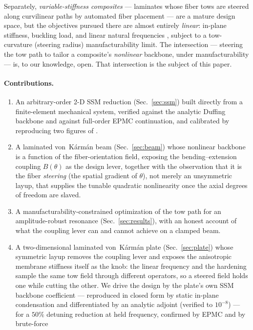\documentclass[11pt]{article}
\begin{document}
Separately, \emph{variable-stiffness composites} --- laminates whose fiber tows
are steered along curvilinear paths by automated fiber placement --- are a mature
design space, but the objectives pursued there are almost entirely
\emph{linear}: in-plane stiffness, buckling load, and linear natural
frequencies \cite{gurdal,ijsselmuiden}, subject to a tow-curvature (steering
radius) manufacturability limit. The intersection --- steering the tow path to
tailor a composite's \emph{nonlinear} backbone, under manufacturability --- is,
to our knowledge, open. That intersection is the subject of this paper.

\paragraph{Contributions.}
\begin{enumerate}
\item An arbitrary-order 2-D SSM reduction (Sec.~\ref{sec:ssm}) built directly
from a finite-element mechanical system, verified against the analytic Duffing
backbone and against full-order EPMC continuation, and calibrated by reproducing
two figures of \cite{pozzi2025}.
\item A laminated von~K\'arm\'an beam (Sec.~\ref{sec:beam}) whose nonlinear
backbone is a function of the fiber-orientation field, exposing the
bending--extension coupling $B(\theta)$ as the design lever, together with the
observation that it is the fiber \emph{steering} (the spatial gradient of
$\theta$), not merely an unsymmetric layup, that supplies the tunable quadratic
nonlinearity once the axial degrees of freedom are slaved.
\item A manufacturability-constrained optimization of the tow path for an
amplitude-robust resonance (Sec.~\ref{sec:results}), with an honest account of
what the coupling lever can and cannot achieve on a clamped beam.
\item A two-dimensional laminated von~K\'arm\'an plate (Sec.~\ref{sec:plate})
whose symmetric layup removes the coupling lever and exposes the anisotropic
membrane stiffness itself as the knob: the linear frequency and the hardening
sample the same tow field through different operators, so a steered field holds
one while cutting the other. We drive the design by the plate's own SSM backbone
coefficient --- reproduced in closed form by static in-plane condensation and
differentiated by an analytic adjoint (verified to $10^{-8}$) --- for a $50\%$
detuning reduction at held frequency, confirmed by EPMC and by brute-force

\end{enumerate}
\end{document}
